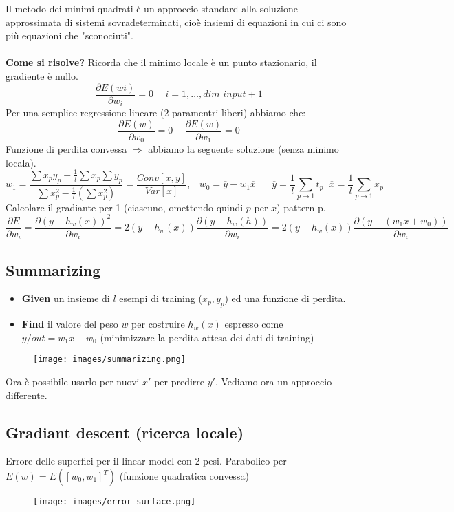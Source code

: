 \hspace{-15pt}Il metodo dei minimi quadrati è un approccio standard alla soluzione approssimata di sistemi sovradeterminati, cioè insiemi di equazioni
in cui ci sono più equazioni che "sconociuti".\\\\
\textbf{Come si risolve?} Ricorda che il minimo locale è un punto stazionario, il gradiente è nullo.
$$\frac{\partial E(wi)}{\partial w_i} = 0 \hspace{15pt} i = 1, \dots, dim\_input + 1$$
Per una semplice regressione lineare (2 paramentri liberi) abbiamo che:
$$\frac{\partial E(w)}{\partial w_0} = 0 \hspace{15pt} \frac{\partial E(w)}{\partial w_1} = 0$$
Funzione di perdita convessa $\Rightarrow$ abbiamo la seguente soluzione (senza minimo locala).
$$w_1 = \frac{\sum x_p y_p - \frac{1}{l}\sum x_p \sum y_p}{\sum x_p^2 - \frac{1}{l} (\sum x_p^2)} = \frac{Conv[x, y]}{Var[x]}, \hspace{10pt} w_0 = \overline{y} - w_1 \overline{x} \hspace{20pt} \overline{y} = \frac{1}{l}\sum_{p \to 1} t_p  \hspace{7pt} \overline{x} = \frac{1}{l}\sum_{p\to 1}x_p$$
Calcolare il gradiante per 1 (ciascuno, omettendo quindi $p$ per $x$) pattern p. 
$$\frac{\partial E}{\partial w_i} = \frac{\partial (y - h_w(x))^2}{\partial w_i} = 2(y - h_w(x))\frac{\partial (y - h_w(h))}{\partial w_i} = 2(y - h_w(x))\frac{\partial (y - (w_1 x + w_0))}{\partial w_i}$$

\subsection{Summarizing}
\begin{itemize}
    \item \textbf{Given} un insieme di $l$ esempi di training ($x_p, y_p$) ed una funzione di perdita.
    \item \textbf{Find} il valore del peso $w$ per costruire $h_w(x)$ espresso come $y/out = w_1 x + w_0$ (minimizzare la perdita attesa dei dati di training)
\end{itemize}
\begin{figure}[h!]
    \centering
    \texttt{[image: images/summarizing.png]}
\end{figure}
Ora è possibile usarlo per nuovi $x'$ per predirre $y'$. Vediamo ora un approccio differente.

\subsection{Gradiant descent (ricerca locale)}
Errore delle superfici per il linear model con 2 pesi. Parabolico per $E(w) = E([w_0, w_1]^T)$ (funzione quadratica convessa)
\begin{figure}[h!]
    \centering
    \texttt{[image: images/error-surface.png]}
\end{figure}

